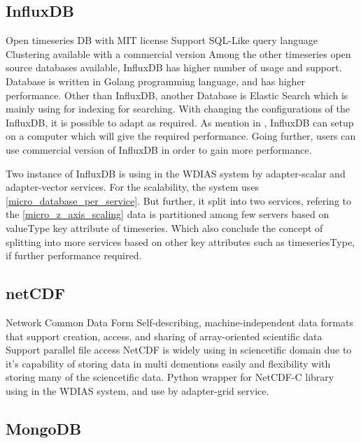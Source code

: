 \subsection{InfluxDB} \cite{influxdbInfluxDBDocumentation}
\label{sub:influxdb}
Open timeseries DB with MIT license
Support SQL-Like query language
Clustering available with a commercial version
Among the other timeseries open source databases available, InfluxDB has higher number of usage and support. Database is written in Golang programming language,
and has higher performance. Other than InfluxDB, another Database is Elastic Search which is mainly using for indexing for searching.
With changing the configurations of the InfluxDB, it is possible to adapt as required. As mention in \cite{influxdbInfluxDBDocumentation}, 
InfluxDB can setup on a computer which will give the required performance. Going further, users can use commercial version of InfluxDB in order to gain more performance.

Two instance of InfluxDB is using in the WDIAS system by adapter-scalar and adapter-vector services. For the scalability, the system uses \ref{micro_database_per_service}.
But further, it split into two services, refering to the \ref{micro_z_axis_scaling} data is partitioned among few servers based on valueType key attribute of timeseries.
Which also conclude the concept of splitting into more services based on other key attributes such as timeseriesType, if further performance required.

\subsection{netCDF} \cite{unidataUnidataNetCDF}
\label{sub:netcdf}
Network Common Data Form
Self-describing, machine-independent data formats that support creation, access, and sharing of array-oriented scientific data
Support parallel file access
NetCDF is widely using in sciencetific domain due to it's capability of storing data in multi dementions easily and flexibility with storing many of the sciencetific data.
Python wrapper for NetCDF-C library using in the WDIAS system, and use by adapter-grid service.

\subsection{MongoDB}
\label{sub:mongodb}

